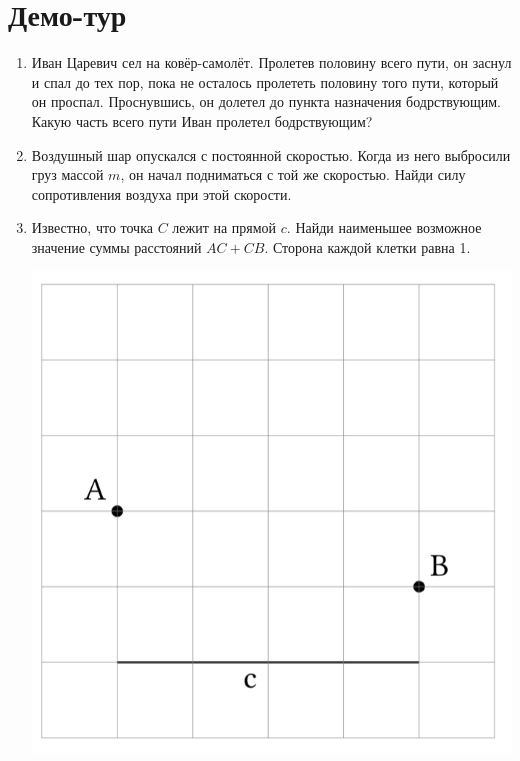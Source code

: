 \documentclass[12pt]{article} %
\begin{document}
\section*{Демо-тур}

\begin{enumerate}
\item Иван Царевич сел на ковёр-самолёт. Пролетев половину всего пути, он заснул и спал до тех пор, 
пока не осталось пролететь половину того пути, который он проспал. 
Проснувшись, он долетел до пункта назначения бодрствующим. Какую часть всего пути Иван пролетел бодрствующим? 

\item Воздушный шар опускался с постоянной скоростью. Когда из него выбросили груз массой $m$, 
он начал подниматься с той же скоростью. Найди силу сопротивления воздуха при этой скорости.





\item 
\begin{minipage}{\linewidth}
        \centering
        \begin{minipage}{0.60\linewidth}
                Известно, что точка $C$ лежит на прямой $c$. Найди наименьшее возможное значение суммы расстояний $AC+CB$. 
                Сторона каждой клетки равна 1.
        \end{minipage}
        \hspace{0.05\linewidth}
        \begin{minipage}{0.3\linewidth}
        \includegraphics[scale=0.2]{lattice.png}
            

\end{minipage}
\end{minipage}
\end{enumerate}
\end{document}
